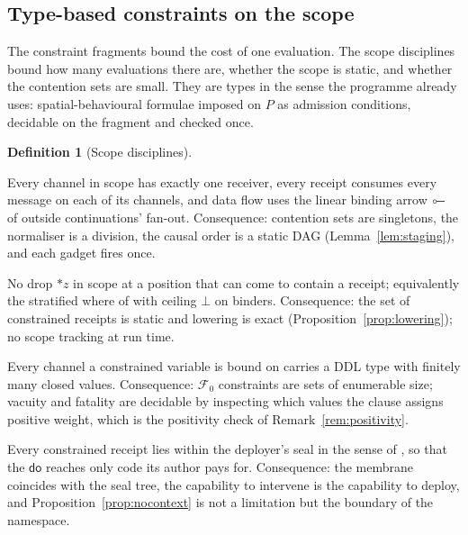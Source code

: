\documentclass[11pt,a4paper]{article}
\theoremstyle{plain}
\theoremstyle{definition}
\newtheorem{definition}[theorem]{Definition}
\theoremstyle{remark}
\newcommand{\dok}{\textsf{do}}
\newcommand{\where}{\textsf{where}}
\newcommand{\lolli}{\mathrel{\reflectbox{$\multimap$}}}
\begin{document}
\subsection{Type-based constraints on the scope}

The constraint fragments bound the cost of one evaluation. The scope
disciplines bound how many evaluations there are, whether the scope is static,
and whether the contention sets are small. They are types in the sense the
programme already uses: spatial-behavioural formulae imposed on $P$ as
admission conditions, decidable on the fragment and checked once.

\begin{definition}[Scope disciplines]\label{def:types}
\begin{description}[leftmargin=1.6em,itemsep=2pt]
\item[$\mathcal{T}_1$ (staged).] Every channel in scope has exactly one
receiver, every receipt consumes every message on each of its channels, and
data flow uses the linear binding arrow $\lolli$ of \cite{GradedQuantum}
outside continuations' fan-out. Consequence: contention sets are singletons,
the normaliser is a division, the causal order is a static DAG
(Lemma~\ref{lem:staging}), and each gadget fires once.
\item[$\mathcal{T}_2$ (flat).] No drop $*z$ in scope at a position that can
come to contain a receipt; equivalently the stratified \where{} of
\cite{ChoiceFormulae} with ceiling $\bot$ on binders. Consequence: the set of
constrained receipts is static and lowering is exact
(Proposition~\ref{prop:lowering}); no scope tracking at run time.
\item[$\mathcal{T}_3$ (finite-domain).] Every channel a constrained variable is
bound on carries a DDL type with finitely many closed values. Consequence:
$\mathcal{F}_0$ constraints are sets of enumerable size; vacuity and fatality
are decidable by inspecting which values the clause assigns positive weight,
which is the positivity check of Remark~\ref{rem:positivity}.
\item[$\mathcal{T}_4$ (confined).] Every constrained receipt lies within the
deployer's seal in the sense of \cite{CostMonad}, so that the $\dok$ reaches
only code its author pays for. Consequence: the membrane coincides with the
seal tree, the capability to intervene is the capability to deploy, and
Proposition~\ref{prop:nocontext} is not a limitation but the boundary of the
namespace.
\end{description}
\end{definition}
\end{document}
